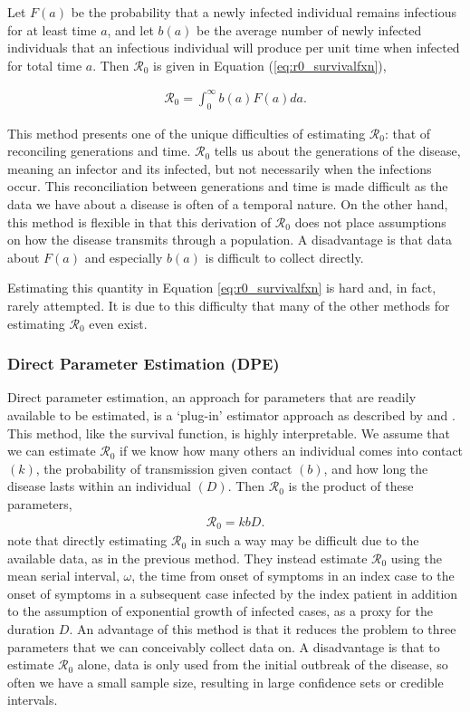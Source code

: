 \documentclass[12pt]{article}
\newcommand{\rr}{\ensuremath{\mathcal{R}_0}}
\begin{document}
Let $F(a)$ be the probability that a newly infected individual remains infectious for at least time $a$, and let $b(a)$ be the average number of newly infected individuals that an infectious individual will produce per unit time when infected for total time $a$.  Then $\rr$ is given in Equation (\ref{eq:r0_survivalfxn}),

\begin{align}\label{eq:r0_survivalfxn}
  \rr = \int_0^\infty b(a)F(a)da.
\end{align}

This method presents one of the unique difficulties of estimating $\rr$: that of reconciling generations and time.  $\rr$ tells us about the generations of the disease, meaning an infector and its infected, but not necessarily when the infections occur.  This reconciliation between generations and time is made difficult as the data we have about a disease is often of a temporal nature.  On the other hand, this method is flexible in that this derivation of $\rr$  does not place assumptions on how the disease transmits through a population.  A disadvantage is that data about $F(a)$ and especially $b(a)$ is difficult to collect directly.

Estimating this quantity in Equation \ref{eq:r0_survivalfxn} is hard and, in fact, rarely attempted. It is due to this difficulty that many of the other methods for estimating $\rr$ even exist.  



\subsubsection{Direct Parameter Estimation (DPE)}
\label{sec:dpe}

Direct parameter estimation, an approach for parameters that are readily available to be estimated, is a `plug-in' estimator approach as described by \cite{lipsitch2003} and \cite{dietz1993estimation}.  This method, like the survival function, is highly interpretable.  We assume that we can estimate $\rr$ if we know how many others an individual comes into contact $(k)$, the probability of transmission given contact $(b)$, and how long the disease lasts within an individual $(D)$.  Then $\rr$ is the product of these parameters, 
\begin{align}\label{eq:dpe}
\rr = kbD.
\end{align}
\cite{lipsitch2003} note that directly estimating $\rr$ in such a way may be difficult due to the available data, as in the previous  method.  They instead estimate $\rr$ using the mean serial interval, $\omega$, the time from onset of symptoms in an index case to the onset of symptoms in a subsequent case infected by the index patient in addition to the assumption of exponential growth of infected cases, as a proxy for the duration $D$.  An advantage of this method is that it reduces the problem to three parameters that we can conceivably collect data on.  A disadvantage is that to estimate $\rr$ alone,  data is only used from the initial outbreak of the disease, so often we have a small sample size, resulting in large confidence sets or credible intervals.
\end{document}

